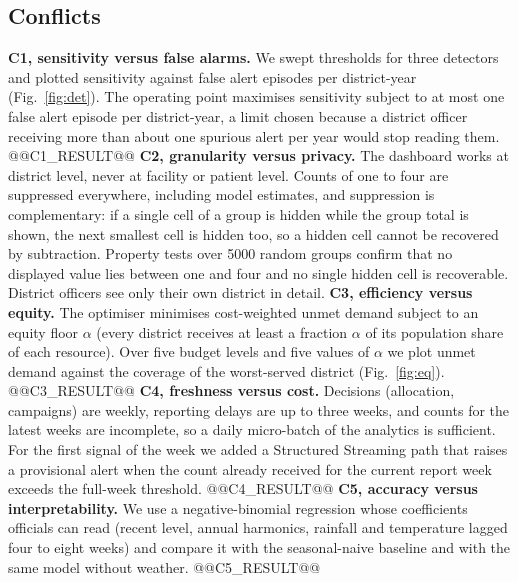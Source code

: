 \subsection{Conflicts}
\textbf{C1, sensitivity versus false alarms.} We swept thresholds for three detectors and plotted sensitivity against false alert episodes per district-year (Fig.~\ref{fig:det}). The operating point maximises sensitivity subject to at most one false alert episode per district-year, a limit chosen because a district officer receiving more than about one spurious alert per year would stop reading them. @@C1_RESULT@@
\textbf{C2, granularity versus privacy.} The dashboard works at district level, never at facility or patient level. Counts of one to four are suppressed everywhere, including model estimates, and suppression is complementary: if a single cell of a group is hidden while the group total is shown, the next smallest cell is hidden too, so a hidden cell cannot be recovered by subtraction. Property tests over 5000 random groups confirm that no displayed value lies between one and four and no single hidden cell is recoverable. District officers see only their own district in detail.
\textbf{C3, efficiency versus equity.} The optimiser minimises cost-weighted unmet demand subject to an equity floor $\alpha$ (every district receives at least a fraction $\alpha$ of its population share of each resource). Over five budget levels and five values of $\alpha$ we plot unmet demand against the coverage of the worst-served district (Fig.~\ref{fig:eq}). @@C3_RESULT@@
\textbf{C4, freshness versus cost.} Decisions (allocation, campaigns) are weekly, reporting delays are up to three weeks, and counts for the latest weeks are incomplete, so a daily micro-batch of the analytics is sufficient. For the first signal of the week we added a Structured Streaming path that raises a provisional alert when the count already received for the current report week exceeds the full-week threshold. @@C4_RESULT@@
\textbf{C5, accuracy versus interpretability.} We use a negative-binomial regression whose coefficients officials can read (recent level, annual harmonics, rainfall and temperature lagged four to eight weeks) and compare it with the seasonal-naive baseline and with the same model without weather. @@C5_RESULT@@
